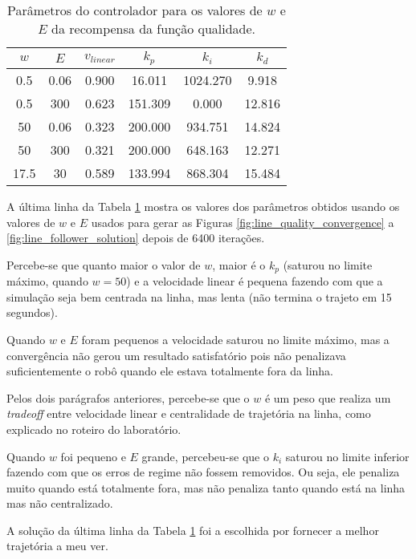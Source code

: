 \documentclass[brazil, 12pt]{article}
\begin{document}
\begin{table}[H]
	\centering
	\caption{Parâmetros do controlador para os valores de $w$ e $E$ da recompensa da função qualidade.}
	\label{tab:teste}
	\begin{tabular}{|c|c||c|c|c|c|}
		\hline
		\multicolumn{1}{|c}{$w$}&\multicolumn{1}{|c||}{$E$}&\multicolumn{1}{|c}{$v_{linear}$}&\multicolumn{1}{|c}{$k_{p}$}&\multicolumn{1}{|c}{$k_{i}$}&\multicolumn{1}{|c|}{$k_{d}$}\\\hline
		0.5 & 0.06 & 0.900 & 16.011 & 1024.270 & 9.918 \\\hline
		0.5 & 300  & 0.623 & 151.309 & 0.000 & 12.816 \\\hline
		50 & 0.06 & 0.323 & 200.000 & 934.751 & 14.824 \\\hline
		50 & 300 & 0.321 & 200.000 & 648.163 & 12.271 \\\hline
		17.5 & 30 & 0.589 & 133.994 & 868.304 & 15.484 \\\hline
	\end{tabular}
\end{table}

A última linha da Tabela \ref{tab:teste} mostra os valores dos parâmetros obtidos usando os valores de $w$ e $E$ usados para gerar as Figuras \ref{fig:line_quality_convergence} a \ref{fig:line_follower_solution} depois de 6400 iterações.

Percebe-se que quanto maior o valor de $w$, maior é o $k_{p}$ (saturou no limite máximo, quando $w=50$) e a velocidade linear é pequena fazendo com que a simulação seja bem centrada na linha, mas lenta (não termina o trajeto em 15 segundos).

Quando $w$ e $E$ foram pequenos a velocidade saturou no limite máximo, mas a convergência não gerou um resultado satisfatório pois não penalizava suficientemente o robô quando ele estava totalmente fora da linha.

Pelos dois parágrafos anteriores, percebe-se que o $w$ é um peso que realiza um \textit{tradeoff} entre velocidade linear e centralidade de trajetória na linha, como explicado no roteiro do laboratório.

Quando $w$ foi pequeno e $E$ grande, percebeu-se que o $k_{i}$ saturou no limite inferior fazendo com que os erros de regime não fossem removidos. Ou seja, ele penaliza muito quando está totalmente fora, mas não penaliza tanto quando está na linha mas não centralizado.

A solução da última linha da Tabela \ref{tab:teste} foi a escolhida por fornecer a melhor trajetória a meu ver.
\end{document}
